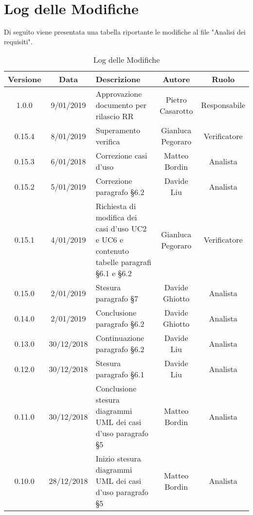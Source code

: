 	\section{Log delle Modifiche}
Di seguito viene presentata una tabella riportante le modifiche al file "Analisi dei requisiti".

\begin{table}[!h] %
            \centering
            \renewcommand{\arraystretch}{2}
            \begin{tabular}{|c|c|p{5cm}|c|c|} %
                \rowcolor{orange!50} %
        		\hline
        		\textbf{Versione} & \textbf{Data} & \textbf{Descrizione} & \textbf{Autore} & \textbf{Ruolo} \\
                \hline
                1.0.0 & 9/01/2019 & Approvazione documento per rilascio RR & Pietro Casarotto & Responsabile \\
                \hline
                0.15.4 & 8/01/2019 & Superamento verifica & Gianluca Pegoraro & Verificatore \\
                \hline
                0.15.3 & 6/01/2018 & Correzione casi d’uso & Matteo Bordin & Analista \\
                \hline
                0.15.2 & 5/01/2019 & Correzione paragrafo §6.2 & Davide Liu & Analista \\
                \hline
                0.15.1 & 4/01/2019 & Richiesta di modifica dei casi d’uso UC2 e UC6 e contenuto tabelle paragrafi §6.1 e §6.2 & Gianluca Pegoraro & Verificatore \\
                \hline
                0.15.0 & 2/01/2019 & Stesura paragrafo §7 & Davide Ghiotto & Analista \\
                \hline
                0.14.0 & 2/01/2019 & Conclusione paragrafo §6.2 & Davide Ghiotto & Analista \\
                \hline
                0.13.0 & 30/12/2018 & Continuazione paragrafo §6.2 & Davide Liu & Analista \\
                \hline
                0.12.0 & 30/12/2018 & Stesura paragrafo §6.1 & Davide Liu & Analista \\
                \hline
                0.11.0 & 30/12/2018 & Conclusione stesura diagrammi UML dei casi d’uso paragrafo §5 & Matteo Bordin & Analista \\
                \hline
               0.10.0 & 28/12/2018 & Inizio stesura diagrammi UML dei casi d'uso paragrafo §5 & Matteo Bordin & Analista \\
                \hline
                
        \end{tabular}
        \caption{Log delle Modifiche} %
        \label{tab:Log delle modifiche}
\end{table}

